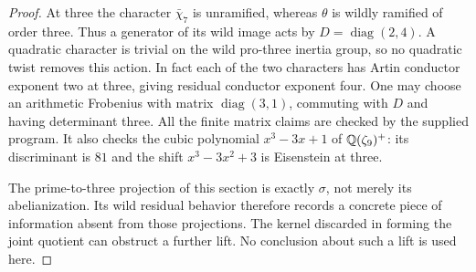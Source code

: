 \begin{proof}
At three the character $\bar\chi_7$ is unramified, whereas $\theta$
is wildly ramified of order three. Thus a generator of its wild image
acts by $D=\operatorname{diag}(2,4)$. A quadratic character is trivial
on the wild pro-three inertia group, so no quadratic twist removes
this action. In fact each of the two characters has Artin conductor
exponent two at three, giving residual conductor exponent four.
One may choose an arithmetic Frobenius with matrix
$\operatorname{diag}(3,1)$, commuting with $D$ and having determinant
three. All the finite matrix claims are checked by the supplied program.
It also checks the cubic polynomial $x^3-3x+1$ of
$\mathbb Q(\zeta_9)^+$: its discriminant is $81$ and the shift
$x^3-3x^2+3$ is Eisenstein at three.

The prime-to-three projection of this section is exactly $\sigma$,
not merely its abelianization. Its wild residual behavior therefore
records a concrete piece of information absent from those projections.
The kernel discarded in forming the joint quotient can obstruct a
further lift. No conclusion about such a lift is used here.
\end{proof}

